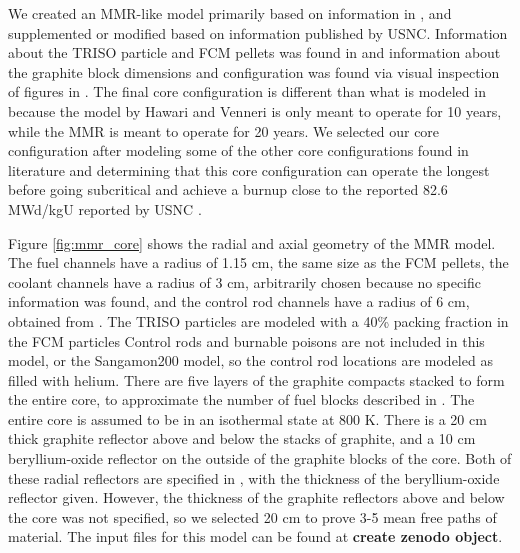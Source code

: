 We created an \gls{MMR}-like model primarily based on information in 
\cite{hawari_development_2018}, and supplemented or modified based on 
information published by \gls{USNC}. Information about the \gls{TRISO} 
particle and \gls{FCM} pellets was found in \cite{noauthor_usnc_2021}
and information about the graphite block dimensions and configuration 
was found via visual inspection of figures in \cite{venneri_micro_2019}. 
The final core configuration 
is different than what is modeled in \cite{hawari_development_2018} 
because the model by Hawari and Venneri is only meant to operate 
for 10 years, while the \gls{MMR} is meant to operate for 20 years. We 
selected our core configuration after modeling some of the other core 
configurations found in literature and determining that this core 
configuration can operate the longest before going subcritical and 
achieve a burnup close to the reported 82.6 MWd/kgU reported by 
\gls{USNC} \cite{noauthor_usnc_2021}. 

Figure \ref{fig:mmr_core} shows the radial and axial geometry of the 
\gls{MMR} model. The fuel channels have a radius of 1.15 cm, the same
size as the \gls{FCM} pellets, the coolant channels have a radius of 
3 cm, arbitrarily chosen because no specific information was found, 
and the control rod channels have a radius of 6 cm, obtained from 
\cite{hawari_development_2018}. The \gls{TRISO} particles are modeled 
with a 40\% packing fraction in the \gls{FCM} particles
Control rods and burnable poisons are not included in this model, or 
the Sangamon200 model, so the control rod locations are modeled as 
filled with helium. There are five layers of the graphite compacts 
stacked to form the entire core, to approximate the number of 
fuel blocks described in \cite{noauthor_usnc_2021}. The entire core 
is assumed to be in an isothermal state at 800 K. There is a 20 cm 
thick graphite reflector above and below the stacks of graphite, 
and a 10 cm beryllium-oxide reflector on the outside of the 
graphite blocks of the core. Both of these radial reflectors are specified 
in \cite{hawari_development_2018}, with the thickness of the 
beryllium-oxide reflector given. However, the thickness of the graphite 
reflectors above and below the core was not specified, so we selected 
20 cm to prove 3-5 mean free paths of material. 
The input files for this model can be found at \textbf{create zenodo 
object}.

